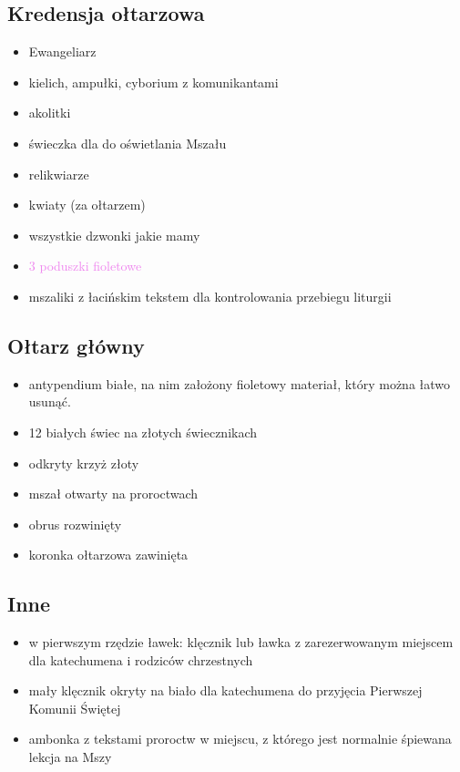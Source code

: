 \subsection{Kredensja ołtarzowa}
\begin{itemize}
	\item Ewangeliarz
	\item kielich, ampułki, cyborium z komunikantami
	\item akolitki
	\item świeczka dla  do oświetlania Mszału
	\item relikwiarze
	\item kwiaty (za ołtarzem)
	\item wszystkie dzwonki jakie mamy
	\item \textcolor{violet}{3 poduszki fioletowe}
	\item mszaliki z łacińskim tekstem dla kontrolowania przebiegu liturgii
\end{itemize}

\subsection{Ołtarz główny}
\begin{itemize}
	\item antypendium białe, na nim założony {\color{violet}fioletowy} materiał,
	      który można łatwo usunąć.
	\item 12 białych świec na złotych świecznikach
	\item odkryty krzyż złoty
	\item mszał otwarty na proroctwach
	\item obrus rozwinięty
	\item koronka ołtarzowa zawinięta
\end{itemize}

\subsection{Inne}
\begin{itemize}
	\item w pierwszym rzędzie ławek: klęcznik lub ławka z zarezerwowanym
	      miejscem dla katechumena i rodziców chrzestnych
	\item mały klęcznik okryty na biało dla katechumena do przyjęcia Pierwszej
	      Komunii Świętej
	\item ambonka z tekstami proroctw w miejscu, z którego jest
	      normalnie śpiewana lekcja na Mszy
\end{itemize}

